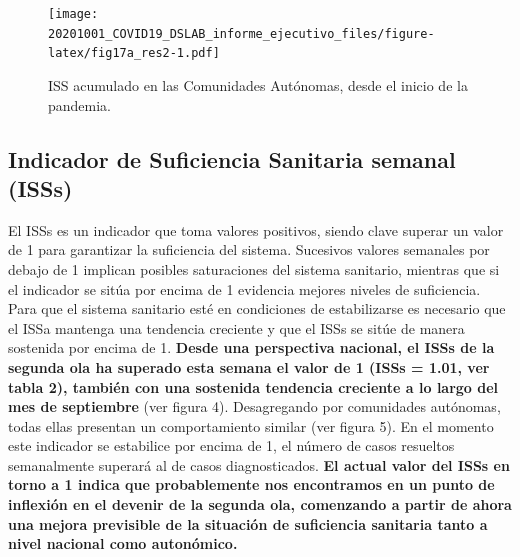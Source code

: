 \documentclass[
  11pt,
]{article}
\begin{document}
\vspace{0.2cm}

\begin{figure}
\centering
\texttt{[image: 20201001\_COVID19\_DSLAB\_informe\_ejecutivo\_files/figure-latex/fig17a\_res2-1.pdf]}
\caption{\label{fig:fig17a_res} ISS acumulado en las Comunidades
Autónomas, desde el inicio de la pandemia.}
\end{figure}

\clearpage

\hypertarget{indicador-de-suficiencia-sanitaria-semanal-isss}{%
\subsection{Indicador de Suficiencia Sanitaria semanal
(ISSs)}\label{indicador-de-suficiencia-sanitaria-semanal-isss}}

El ISSs es un indicador que toma valores positivos, siendo clave superar
un valor de 1 para garantizar la suficiencia del sistema. Sucesivos
valores semanales por debajo de 1 implican posibles saturaciones del
sistema sanitario, mientras que si el indicador se sitúa por encima de 1
evidencia mejores niveles de suficiencia. Para que el sistema sanitario
esté en condiciones de estabilizarse es necesario que el ISSa mantenga
una tendencia creciente y que el ISSs se sitúe de manera sostenida por
encima de 1. \textbf{Desde una perspectiva nacional, el ISSs de la
segunda ola ha superado esta semana el valor de 1 (ISSs = 1.01, ver
tabla 2), también con una sostenida tendencia creciente a lo largo del
mes de septiembre} (ver figura 4). Desagregando por comunidades
autónomas, todas ellas presentan un comportamiento similar (ver figura
5). En el momento este indicador se estabilice por encima de 1, el
número de casos resueltos semanalmente superará al de casos
diagnosticados. \textbf{El actual valor del ISSs en torno a 1 indica que
probablemente nos encontramos en un punto de inflexión en el devenir de
la segunda ola, comenzando a partir de ahora una mejora previsible de la
situación de suficiencia sanitaria tanto a nivel nacional como
autonómico.}
\end{document}
